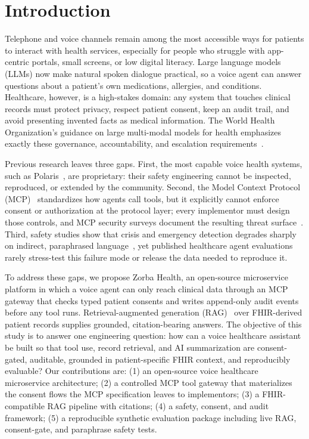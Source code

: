 \documentclass[conference]{IEEEtran}
\begin{document}
\section{Introduction}
Telephone and voice channels remain among the most accessible ways for patients to interact with health services, especially for people who struggle with app-centric portals, small screens, or low digital literacy.
Large language models (LLMs) now make natural spoken dialogue practical, so a voice agent can answer questions about a patient's own medications, allergies, and conditions.
Healthcare, however, is a high-stakes domain: any system that touches clinical records must protect privacy, respect patient consent, keep an audit trail, and avoid presenting invented facts as medical information.
The World Health Organization's guidance on large multi-modal models for health emphasizes exactly these governance, accountability, and escalation requirements~\cite{who2024lmm}.

Previous research leaves three gaps.
First, the most capable voice health systems, such as Polaris~\cite{mukherjee2024polaris}, are proprietary: their safety engineering cannot be inspected, reproduced, or extended by the community.
Second, the Model Context Protocol (MCP)~\cite{mcp2024} standardizes how agents call tools, but it explicitly cannot enforce consent or authorization at the protocol layer; every implementor must design those controls, and MCP security surveys document the resulting threat surface~\cite{hou2025mcplandscape}.
Third, safety studies show that crisis and emergency detection degrades sharply on indirect, paraphrased language~\cite{deng2025psycrisisbench,arnaiz2026crisis}, yet published healthcare agent evaluations rarely stress-test this failure mode or release the data needed to reproduce it.

To address these gaps, we propose Zorba Health, an open-source microservice platform in which a voice agent can only reach clinical data through an MCP gateway that checks typed patient consents and writes append-only audit events before any tool runs.
Retrieval-augmented generation (RAG)~\cite{lewis2020rag} over FHIR-derived patient records supplies grounded, citation-bearing answers.
The objective of this study is to answer one engineering question: how can a voice healthcare assistant be built so that tool use, record retrieval, and AI summarization are consent-gated, auditable, grounded in patient-specific FHIR context, and reproducibly evaluable?
Our contributions are:
(1) an open-source voice healthcare microservice architecture;
(2) a controlled MCP tool gateway that materializes the consent flows the MCP specification leaves to implementors;
(3) a FHIR-compatible RAG pipeline with citations;
(4) a safety, consent, and audit framework;
(5) a reproducible synthetic evaluation package including live RAG, consent-gate, and paraphrase safety tests.
\end{document}
